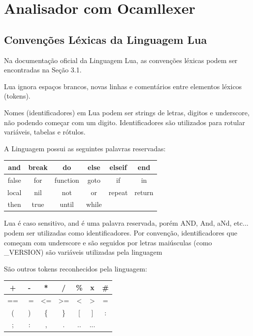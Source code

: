 \documentclass[12pt,a4paper,twoside]{report}
\begin{document}
\section{Analisador com Ocamllexer}
\subsection{Convenções Léxicas da Linguagem Lua}
Na documentação oficial da Linguagem Lua, as convenções léxicas podem ser encontradas na Seção 3.1.

Lua ignora espaços brancos, novas linhas e comentários entre elementos léxicos (tokens).

Nomes (identificadores) em Lua podem ser strings de letras, digitos e underscore, não podendo começar com um digito. Identificadores são utilizados para rotular variáveis, tabelas e rótulos.

A Linguagem possui as seguintes palavras reservadas:

\begin{center}
\begin{tabular} {| c | c | c | c | c | c | }
\hline
and & break & do & else & elseif & end \\
\hline
false & for & function & goto & if & in \\
\hline
local & nil & not & or & repeat & return \\
\hline
then & true & until & while & &\\
\hline
\end{tabular}
\end{center}

Lua é caso sensitivo, and é uma palavra reservada, porém AND, And, aNd, etc... podem ser utilizadas como identificadores. Por convenção, identificadores que começam com underscore e são seguidos por letras maiúsculas (como \_VERSION) são variáveis utilizadas pela linguagem

São outros tokens reconhecidos pela linguagem:


\begin{center}
\begin{tabular} {| c | c | c | c | c | c | c |}
\hline
+ & - & * & / & \% & x & \# \\
\hline
==&~=&<=&>=&<&>&=\\
\hline
( & ) & \{ & \} & [ & ] & :\\
\hline
; & : & , & . & .. & ... & \\
\hline
\end{tabular}
\end{center}
\end{document}
